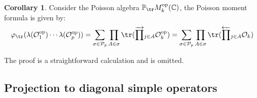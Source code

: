 \documentclass[a4paper,11pt]{article}
\theoremstyle{definition}
\numberwithin{equation}{section}
\newtheorem{corollary}[lemma]{Corollary}
\begin{document}
\begin{corollary}
    Consider the Poisson algebra $\mathbb{P}_{\tr}M^\text{op}_k(\mathbb{C})$, the Poisson moment formula is given by:
    \begin{equation}
        \varphi_{\tr}(\lambda(\mathcal{O}_1^\text{op})\cdots\lambda(\mathcal{O}^\text{op}_p)) = \sum_{\sigma\in\mathcal{P}_p}\prod_{A\in\sigma}\tr(\overrightarrow{\prod}_{j\in A}\mathcal{O}^\text{op}_k) = \sum_{\sigma\in\mathcal{P}_p}\prod_{A\in\sigma}\tr(\overleftarrow{\prod}_{j\in A}\mathcal{O}_k)
    \end{equation}
\end{corollary}
The proof is a straightforward calculation and is omitted.

\subsection{Projection to diagonal simple operators}
\end{document}
